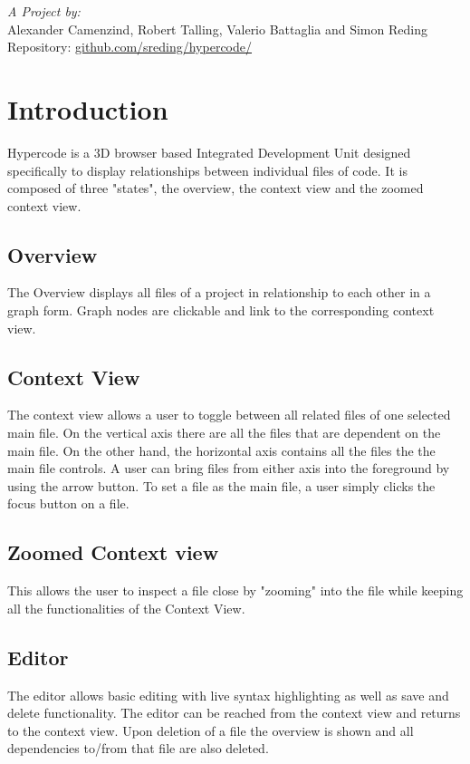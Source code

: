 \documentclass[a4paper]{article}
\author{Client: \realauthor \\
Universit\`a della Svizzera italiana - \coursename}
\title{\assingmentnr}
\begin{document}
\maketitle{\raggedleft}
\emph{A Project by:}\\
Alexander Camenzind, Robert Talling, Valerio Battaglia and Simon Reding\\

Repository: \href{https://github.com/sreding/hypercode/}{github.com/sreding/hypercode/}

\section{Introduction}
Hypercode is a 3D browser based Integrated Development Unit designed specifically to display relationships between individual files of code. It is composed of three "states", the overview, the context view and the zoomed context view.
\subsection{Overview}
The Overview displays all files of a project in relationship to each other in a graph form. Graph nodes are clickable and link to the corresponding context view.
\subsection{Context View}
The context view allows a user to toggle between all related files of one selected main file. On the vertical axis there are all the files that are dependent on the main file. On the other hand, the horizontal axis contains all the files the the main file controls. A user can bring files from either axis into the foreground by using the arrow button. To set a file as the main file, a user simply clicks the focus button on a file. 

\subsection{Zoomed Context view}
This allows the user to inspect a file close by "zooming" into the file while keeping all the functionalities of the Context View.

\subsection{Editor}
The editor allows basic editing with live syntax highlighting as well as save and delete functionality. The editor can be reached from the context view and returns to the context view. Upon deletion of a file the overview is shown and all dependencies to/from that file are also deleted.
\end{document}
